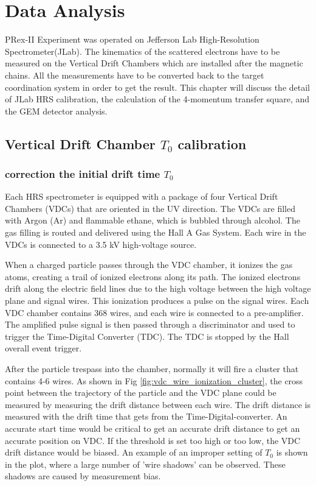 \chapter{Data Analysis}

PRex-II Experiment was operated on Jefferson Lab High-Resolution Spectrometer(JLab). The kinematics of the scattered electrons have to be measured on the Vertical Drift Chambers which are installed after the magnetic chains. All the measurements have to be converted back to the target coordination system in order to get the result. This chapter will discuss the detail of JLab HRS calibration, the calculation of the 4-momentum transfer square, and the GEM detector analysis. 

\section{Vertical Drift Chamber $T_0$ calibration}

\subsection{correction the initial drift time $T_0$}

Each HRS spectrometer is equipped with a package of four Vertical Drift Chambers (VDCs) that are oriented in the UV direction. The VDCs are filled with Argon (Ar) and flammable ethane, which is bubbled through alcohol. The gas filling is routed and delivered using the Hall A Gas System. Each wire in the VDCs is connected to a 3.5 kV high-voltage source.

When a charged particle passes through the VDC chamber, it ionizes the gas atoms, creating a trail of ionized electrons along its path. The ionized electrons drift along the electric field lines due to the high voltage between the high voltage plane and signal wires. This ionization produces a pulse on the signal wires. Each VDC chamber contains 368 wires, and each wire is connected to a pre-amplifier. The amplified pulse signal is then passed through a discriminator and used to trigger the Time-Digital Converter (TDC). The TDC is stopped by the Hall overall event trigger.

After the particle trespass into the chamber, normally it will fire a cluster that contains 4-6 wires. As shown in Fig \ref{fig:vdc_wire_ionization_cluster}, the cross point between the trajectory of the particle and the VDC plane could be measured by measuring the drift distance between each wire. The drift distance is measured with the drift time that gets from the Time-Digital-converter. An accurate start time would be critical to get an accurate drift distance to get an accurate position on VDC.  If the threshold is set too high or too low, the VDC drift distance would be biased. An example of an improper setting of $T_0$ is shown in the plot, where a large number of 'wire shadows' can be observed. These shadows are caused by measurement bias.

